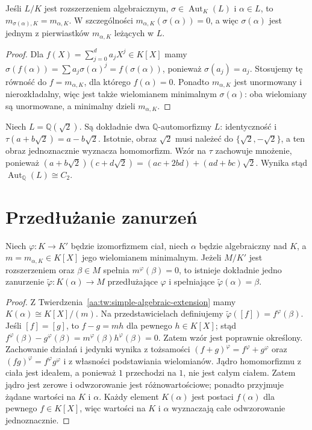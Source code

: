 \begin{stwierdzenie}
\label{aa:st:automorphism-minimal-polynomial}
Jeśli $L/K$ jest rozszerzeniem algebraicznym,
$\sigma\in\operatorname{Aut}_K(L)$ i $\alpha\in L$, to
$m_{\sigma(\alpha),K}=m_{\alpha,K}$.
W szczególności $m_{\alpha,K}(\sigma(\alpha))=0$,
a więc $\sigma(\alpha)$ jest jednym z pierwiastków
$m_{\alpha,K}$ leżących w $L$.
\end{stwierdzenie}
\begin{proof}
Dla $f(X)=\sum_{j=0}^d a_jX^j\in K[X]$ mamy
$\sigma(f(\alpha))=\sum a_j\sigma(\alpha)^j=f(\sigma(\alpha))$,
ponieważ $\sigma(a_j)=a_j$. Stosujemy tę równość do
$f=m_{\alpha,K}$, dla którego $f(\alpha)=0$.
Ponadto $m_{\alpha,K}$ jest unormowany i nierozkładalny,
więc jest także wielomianem minimalnym $\sigma(\alpha)$:
oba wielomiany są unormowane, a minimalny dzieli
$m_{\alpha,K}$.
\end{proof}

\begin{przyklad}
\label{aa:prz:quadratic-conjugation}
Niech $L=\mathbb Q(\sqrt2)$. Są dokładnie dwa
$\mathbb Q$-automorfizmy $L$: identyczność i
$\tau(a+b\sqrt2)=a-b\sqrt2$. Istotnie, obraz $\sqrt2$
musi należeć do $\{\sqrt2,-\sqrt2\}$, a ten obraz jednoznacznie
wyznacza homomorfizm. Wzór na $\tau$ zachowuje mnożenie, ponieważ
$(a+b\sqrt2)(c+d\sqrt2)=(ac+2bd)+(ad+bc)\sqrt2$.
Wynika stąd $\operatorname{Aut}_{\mathbb Q}(L)\cong C_2$.
\end{przyklad}

\section{Przedłużanie zanurzeń}
\begin{lemat}
\label{aa:lem:extend-embedding-simple}
Niech $\varphi:K\to K'$ będzie izomorfizmem ciał,
niech $\alpha$ będzie algebraiczny nad $K$, a
$m=m_{\alpha,K}\in K[X]$ jego wielomianem minimalnym.
Jeżeli $M/K'$ jest rozszerzeniem oraz $\beta\in M$ spełnia
$m^\varphi(\beta)=0$, to istnieje dokładnie jedno zanurzenie
$\widetilde\varphi:K(\alpha)\to M$ przedłużające
$\varphi$ i spełniające $\widetilde\varphi(\alpha)=\beta$.
\end{lemat}
\begin{proof}
Z Twierdzenia~\ref{aa:tw:simple-algebraic-extension} mamy
$K(\alpha)\cong K[X]/(m)$. Na przedstawicielach definiujemy
$\widetilde\varphi([f])=f^\varphi(\beta)$.
Jeśli $[f]=[g]$, to $f-g=mh$ dla pewnego $h\in K[X]$;
stąd $f^\varphi(\beta)-g^\varphi(\beta)=
m^\varphi(\beta)h^\varphi(\beta)=0$.
Zatem wzór jest poprawnie określony. Zachowanie działań
i jedynki wynika z tożsamości
$(f+g)^\varphi=f^\varphi+g^\varphi$ oraz
$(fg)^\varphi=f^\varphi g^\varphi$ i z własności
podstawiania wielomianów. Jądro homomorfizmu z ciała
jest ideałem, a ponieważ $1$ przechodzi na $1$, nie
jest całym ciałem. Zatem jądro jest zerowe i odwzorowanie
jest różnowartościowe; ponadto przyjmuje żądane wartości
na $K$ i $\alpha$.
Każdy element $K(\alpha)$ jest postaci $f(\alpha)$ dla
pewnego $f\in K[X]$, więc wartości na $K$ i $\alpha$
wyznaczają całe odwzorowanie jednoznacznie.
\end{proof}

